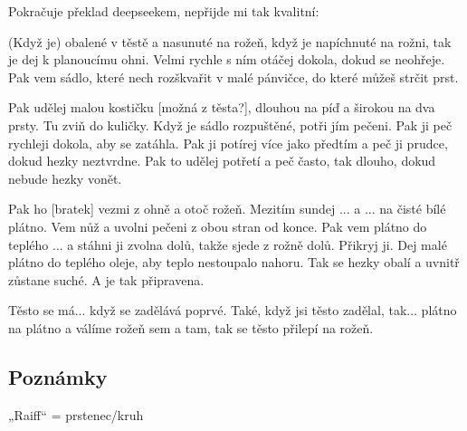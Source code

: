 Pokračuje překlad deepseekem, nepřijde mi tak kvalitní:

(Když je) obalené v těstě a nasunuté na rožeň, když je napíchnuté na
rožni, tak je dej k planoucímu ohni. Velmi rychle s ním otáčej dokola,
dokud se neohřeje. Pak vem sádlo, které nech rozškvařit v malé pánvičce,
do které můžeš strčit prst.

Pak udělej malou kostičku {[}možná z těsta?{]}, dlouhou na píď a širokou
na dva prsty. Tu zviň do kuličky. Když je sádlo rozpuštěné, potři jím
pečeni. Pak ji peč rychleji dokola, aby se zatáhla. Pak ji potírej více
jako předtím a peč ji prudce, dokud hezky neztvrdne. Pak to udělej
potřetí a peč často, tak dlouho, dokud nebude hezky vonět.

Pak ho {[}bratek{]} vezmi z ohně a otoč rožeň. Mezitím sundej ... a ...
na čisté bílé plátno. Vem nůž a uvolni pečeni z obou stran od konce. Pak
vem plátno do teplého ... a stáhni ji zvolna dolů, takže sjede z rožně
dolů. Přikryj ji. Dej malé plátno do teplého oleje, aby teplo nestoupalo
nahoru. Tak se hezky obalí a uvnitř zůstane suché. A je tak připravena.

Těsto se má... když se zadělává poprvé. Také, když jsi těsto zadělal,
tak... plátno na plátno a válíme rožeň sem a tam, tak se těsto přilepí
na rožeň.

\subsection{Poznámky}\label{250922-1759}

„Raiff`` = prstenec/kruh
